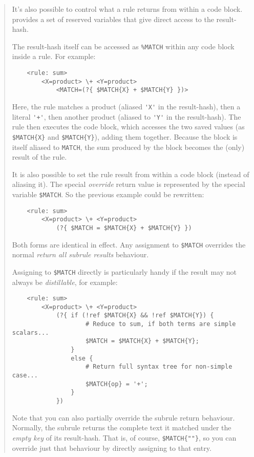 \begin{it}\begin{quotation}
It's also possible to control what a rule returns from within a code
block.  provides a set of reserved variables that give
direct access to the result-hash.

The result-hash itself can be accessed as \verb|%MATCH| within any code block
inside a rule. For example:

\begin{verbatim}
    <rule: sum> 
        <X=product> \+ <Y=product>
            <MATCH=(?{ $MATCH{X} + $MATCH{Y} })>
\end{verbatim}

Here, the rule matches a product (aliased \verb|'X'| in the result-hash), then a
literal \verb|'+'|, then another product (aliased to \verb|'Y'| in the result-hash). The
rule then executes the code block, which accesses the two saved values
(as \verb|$MATCH{X}| and \verb|$MATCH{Y}|), adding them together. Because the block
is itself aliased to \verb|MATCH|, the sum produced by the block becomes the
(only) result of the rule.

It is also possible to set the rule result from within a code block
(instead of aliasing it). The special \emph{override} return value is
represented by the special variable \verb|$MATCH|. So the previous example
could be rewritten:

\begin{verbatim}
    <rule: sum> 
        <X=product> \+ <Y=product>
            (?{ $MATCH = $MATCH{X} + $MATCH{Y} })
\end{verbatim}
Both forms are identical in effect. Any assignment to \verb|$MATCH| overrides
the normal \emph{return all subrule results} behaviour.


Assigning to \verb|$MATCH| directly is particularly handy if the result may
not always be \emph{distillable}, for example:

\begin{verbatim}
    <rule: sum> 
        <X=product> \+ <Y=product>
            (?{ if (!ref $MATCH{X} && !ref $MATCH{Y}) {
                    # Reduce to sum, if both terms are simple scalars...
                    $MATCH = $MATCH{X} + $MATCH{Y};
                }
                else {
                    # Return full syntax tree for non-simple case...
                    $MATCH{op} = '+';
                }
            })
\end{verbatim}

Note that you can also partially override the subrule return
behaviour. Normally, the subrule returns the complete text it matched
under the \emph{empty key} of its result-hash. That is, of course, 
\verb|$MATCH{""}|,
so you can override just that behaviour by directly assigning to that
entry.


\end{quotation}
\end{it}
